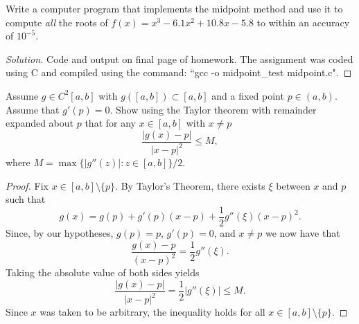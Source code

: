 \documentclass[8pt]{article}
\theoremstyle{definition}
\newenvironment{exercise}[1]
  {\renewcommand\theinnerexercise{#1}\innerexercise}
  {\endinnerexercise}
\begin{document}
\begin{exercise}{4}
Write a computer program that implements the midpoint method and use it to compute \emph{all} the roots of $f(x) = x^3 - 6.1 x^2 + 10.8 x - 5.8$ to within an accuracy of $10^{-5}$.	
\end{exercise}
\begin{proof}[Solution]
Code and output on final page of homework. The assignment was coded using C and compiled using the command: ``gcc -o midpoint\_test midpoint.c".
\end{proof}

\begin{exercise}{5}
Assume $g \in C^2[a, b]$ with $g \left( [a, b] \right) \subset [a,b]$ and a fixed point $p \in (a, b)$. Assume that $g' (p) = 0$. Show using the Taylor theorem with remainder expanded about $p$ that for any $x \in [a, b]$ with $x \neq p$ $$\frac{|g(x) - p|}{|x - p|^2} \leq M,$$ where $M = \max \{ |g''(z)| : z \in [a, b] \}/2$.
\end{exercise}
\begin{proof}
Fix $x \in [a, b] \setminus \{ p \}$. By Taylor's Theorem, there exists $\xi$ between $x$ and $p$ such that $$g(x) = g(p) + g'(p) (x - p) + \frac{1}{2} g''(\xi) (x - p)^2.$$ Since, by our hypotheses, $g(p) = p$, $g'(p) = 0$, and $x \neq p$ we now have that $$\frac{g(x) - p}{(x - p)^2} = \frac{1}{2} g''(\xi).$$ Taking the absolute value of both sides yields $$\frac{|g(x) - p|}{|x - p|^2} = \frac{1}{2} |g''(\xi)| \leq M.$$ Since $x$ was taken to be arbitrary, the inequality holds for all $x \in [a,b] \setminus \{ p \}$.
\end{proof}
\end{document}
